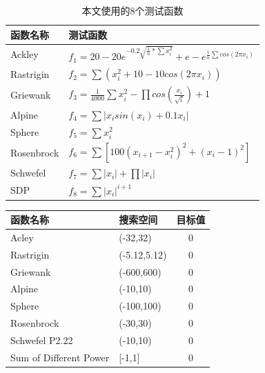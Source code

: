 \begin{table}[htbp]
	\label{tab3}
	\centering
	\caption{本文使用的8个测试函数}
	\begin{tabular}{ll}
		\toprule[1.5pt]
		\textbf{函数名称}  & \textbf{测试函数} \\
		\midrule[1pt]
		Ackley & $f_1=20-20e^{-0.2\sqrt{\frac{1}{n}*\sum x_i^2}}+e-e^{\frac{1}{n}\sum cos(2\pi x_i)} $ \\
		Rastrigin & $f_2=\sum (x_i^2+10-10cos(2\pi x_i))$    \\
		Griewank & $ f_3=\frac{1}{4000}\sum x_i^2-\prod cos(\frac{x_i}{\sqrt{i}})+1 $     \\
		Alpine & $ f_4=\sum |x_isin(x_i)+0.1x_i| $    \\
		Sphere & $ f_5=\sum x_i^2 $    \\
		Rosenbrock & $ f_6=\sum [100(x_{i+1}-x_i^2)^2+(x_i-1)^2] $  \\
		Schwefel & $ f_7=\sum |x_i|+\prod |x_i| $   \\
		SDP & $ f_8=\sum |x_i|^{i+1} $  \\
		\bottomrule[1.5pt]
	\end{tabular}%
\end{table}%
\begin{table}[htbp]
	\begin{tabular}{p{4.3cm}p{3cm}c}
		\toprule[1.5pt]
		\textbf{函数名称}  & \textbf{搜索空间}  & \multicolumn{1}{l}{\textbf{目标值}} \\
		\midrule[1pt]
		Acley & (-32,32) & 0 \\
		Rastrigin & (-5.12,5.12) & 0 \\
		Griewank & (-600,600) & 0 \\
		Alpine & (-10,10) & 0 \\
		Sphere & (-100,100) & 0 \\
		Rosenbrock & (-30,30) & 0 \\
		Schwefel P2.22 & (-10,10) & 0 \\
		Sum of Different Power & [-1,1] & 0 \\
		\bottomrule[1.5pt]
	\end{tabular}%
	
\end{table}%


